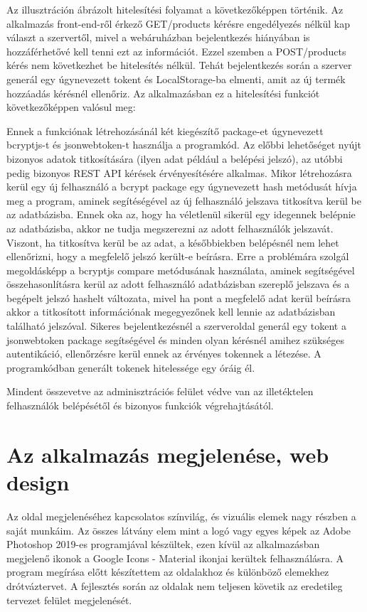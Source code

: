 Az illusztráción ábrázolt hitelesítési folyamat a következőképpen történik. Az alkalmazás front-end-ről érkező GET/products kérésre engedélyezés nélkül kap választ a szervertől, mivel a webáruházban bejelentkezés hiányában is hozzáférhetővé kell tenni ezt az információt. Ezzel szemben a POST/products kérés nem következhet be hitelesítés nélkül. Tehát bejelentkezés során a szerver generál egy úgynevezett tokent és LocalStorage-ba elmenti, amit az új termék hozzáadás kérésnél ellenőriz. Az alkalmazásban ez a hitelesítési funkciót következőképpen valósul meg:

Ennek a funkciónak létrehozásánál két kiegészítő package-et úgynevezett bcryptjs-t és jsonwebtoken-t használja a programkód. Az előbbi lehetőséget nyújt bizonyos adatok titkosítására (ilyen adat például a belépési jelszó), az utóbbi pedig bizonyos REST API kérések érvényesítésére alkalmas. Mikor létrehozásra kerül egy új felhasználó a bcrypt package egy úgynevezett hash metódusát hívja meg a program, aminek segítéségével az új felhasználó jelszava titkosítva kerül be az adatbázisba. Ennek oka az, hogy ha véletlenül sikerül egy idegennek belépnie az adatbázisba, akkor ne tudja megszerezni az adott felhasználók jelszavát. Viszont, ha titkosítva kerül be az adat, a későbbiekben belépésnél nem lehet ellenőrizni, hogy a megfelelő jelszó került-e beírásra. Erre a problémára szolgál megoldásképp a bcryptjs compare metódusának használata, aminek segítségével összehasonlításra kerül az adott felhasználó adatbázisban szereplő jelszava és a begépelt jelszó hashelt változata, mivel ha pont a megfelelő adat kerül beírásra akkor a titkosított információnak megegyezőnek kell lennie az adatbázisban található jelszóval. Sikeres bejelentkezésnél a szerveroldal generál egy tokent a jsonwebtoken package segítségével és minden olyan kérésnél amihez szükséges autentikáció, ellenőrzésre kerül ennek az érvényes tokennek a létezése. A programkódban generált tokenek hitelessége egy óráig él.

Mindent összevetve az adminisztrációs felület védve van az illetéktelen felhasználók belépésétől és bizonyos funkciók végrehajtásától.

\section{Az alkalmazás megjelenése, web design}
Az oldal megjelenéséhez kapcsolatos színvilág, és vizuális elemek nagy részben a saját munkáim. Az összes látvány elem mint a logó vagy egyes képek az Adobe Photoshop 2019-es programjával készültek, ezen kívül az alkalmazásban megjelenő ikonok a Google Icons - Material ikonjai kerültek felhasználásra. A program megírása előtt készítettem az oldalakhoz és különböző elemekhez drótváztervet. A fejlesztés során az oldalak nem teljesen követik az eredetileg tervezet felület megjelenését.

